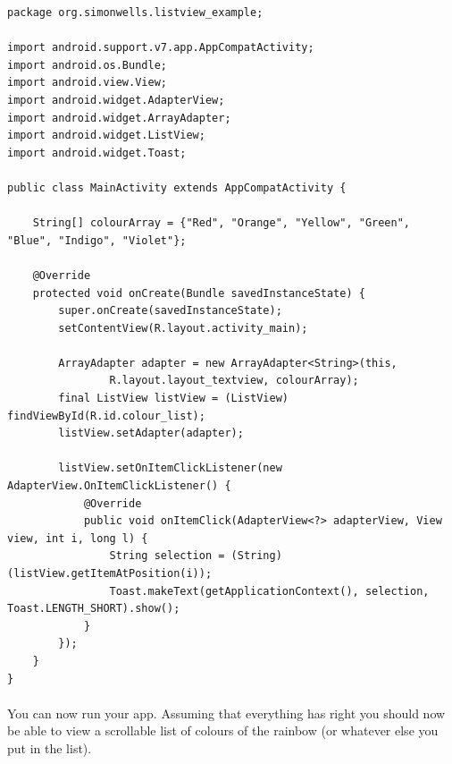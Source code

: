 \begin{lstlisting}
package org.simonwells.listview_example;

import android.support.v7.app.AppCompatActivity;
import android.os.Bundle;
import android.view.View;
import android.widget.AdapterView;
import android.widget.ArrayAdapter;
import android.widget.ListView;
import android.widget.Toast;

public class MainActivity extends AppCompatActivity {

    String[] colourArray = {"Red", "Orange", "Yellow", "Green", "Blue", "Indigo", "Violet"};

    @Override
    protected void onCreate(Bundle savedInstanceState) {
        super.onCreate(savedInstanceState);
        setContentView(R.layout.activity_main);

        ArrayAdapter adapter = new ArrayAdapter<String>(this,
                R.layout.layout_textview, colourArray);
        final ListView listView = (ListView) findViewById(R.id.colour_list);
        listView.setAdapter(adapter);

        listView.setOnItemClickListener(new AdapterView.OnItemClickListener() {
            @Override
            public void onItemClick(AdapterView<?> adapterView, View view, int i, long l) {
                String selection = (String) (listView.getItemAtPosition(i));
                Toast.makeText(getApplicationContext(), selection, Toast.LENGTH_SHORT).show();
            }
        });
    }
}
\end{lstlisting}

\paragraph{} You can now run your app. Assuming that everything has right you should now be able to view a scrollable list of colours of the rainbow (or whatever else you put in the list).

